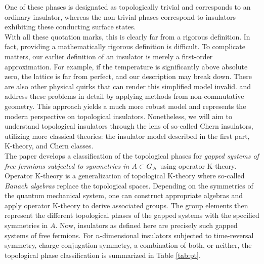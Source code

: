 One of these phases is designated as {\glqq}topologically trivial{\grqq} and corresponds to an ordinary insulator, whereas the {\glqq}non-trivial{\grqq} phases correspond to insulators exhibiting these conducting surface states.
\\
With all these quotation marks, this is clearly far from a rigorous definition.
In fact, providing a mathematically rigorous definition is difficult.
To complicate matters, our earlier definition of an insulator is merely a first-order approximation.
For example, if the temperature is significantly above absolute zero, the lattice is far from perfect, and our description may break down.
There are also other physical quirks that can render this simplified model invalid.
\cite{5cb8b651} and \cite{f94459b0} address these problems in detail by applying methods from non-commutative geometry.
This approach yields a much more robust model and represents the modern perspective on topological insulators.
Nonetheless, we will aim to understand topological insulators through the lens of so-called Chern insulators, utilizing more classical theories: the insulator model described in the first part, K-theory, and Chern classes.
\\
The paper \cite{c9fb3de7} develops a classification of the topological phases for \textit{gapped systems of free fermions subjected to symmetries in $A \subset G_{\mathcal{H}}$} using operator K-theory.
Operator K-theory is a generalization of topological K-theory where so-called \textit{Banach algebras} replace the topological spaces.
Depending on the symmetries of the quantum mechanical system, one can construct appropriate algebras and apply operator K-theory to derive associated groups.
The group elements then represent the different topological phases of the gapped systems with the specified symmetries in $A$.
Now, insulators as defined here are precisely such gapped systems of free fermions.
For $n$-dimensional insulators subjected to time-reversal symmetry, charge conjugation symmetry, a combination of both, or neither, the topological phase classification is summarized in Table \ref{tab:pt}.
